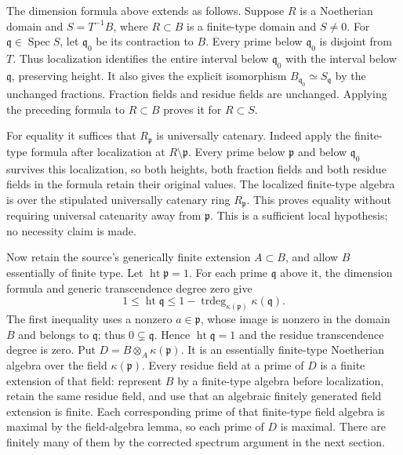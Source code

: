 The dimension formula above extends as follows. Suppose \(R\) is a Noetherian domain and \(S=T^{-1}B\), where \(R\subset B\) is a finite-type domain and \(S\ne0\). For \(\mathfrak q\in\operatorname{Spec}S\), let \(\mathfrak q_0\) be its contraction to \(B\). Every prime below \(\mathfrak q_0\) is disjoint from \(T\). Thus localization identifies the entire interval below \(\mathfrak q_0\) with the interval below \(\mathfrak q\), preserving height. It also gives the explicit isomorphism \(B_{\mathfrak q_0}\simeq S_{\mathfrak q}\) by the unchanged fractions. Fraction fields and residue fields are unchanged. Applying the preceding formula to \(R\subset B\) proves it for \(R\subset S\).

For equality it suffices that \(R_{\mathfrak p}\) is universally catenary. Indeed apply the finite-type formula after localization at \(R\setminus\mathfrak p\). Every prime below \(\mathfrak p\) and below \(\mathfrak q_0\) survives this localization, so both heights, both fraction fields and both residue fields in the formula retain their original values. The localized finite-type algebra is over the stipulated universally catenary ring \(R_{\mathfrak p}\). This proves equality without requiring universal catenarity away from \(\mathfrak p\). This is a sufficient local hypothesis; no necessity claim is made.

Now retain the source's generically finite extension \(A\subset B\), and allow \(B\) essentially of finite type. Let \(\operatorname{ht}\mathfrak p=1\). For each prime \(\mathfrak q\) above it, the dimension formula and generic transcendence degree zero give \[
 1\leq\operatorname{ht}\mathfrak q
 \leq1-\operatorname{trdeg}_{\kappa(\mathfrak p)}\kappa(\mathfrak q).
\] The first inequality uses a nonzero \(a\in\mathfrak p\), whose image is nonzero in the domain \(B\) and belongs to \(\mathfrak q\); thus \(0\subsetneq\mathfrak q\). Hence \(\operatorname{ht}\mathfrak q=1\) and the residue transcendence degree is zero. Put \(D=B\otimes_A\kappa(\mathfrak p)\). It is an essentially finite-type Noetherian algebra over the field \(\kappa(\mathfrak p)\). Every residue field at a prime of \(D\) is a finite extension of that field: represent \(B\) by a finite-type algebra before localization, retain the same residue field, and use that an algebraic finitely generated field extension is finite. Each corresponding prime of that finite-type field algebra is maximal by the field-algebra lemma, so each prime of \(D\) is maximal. There are finitely many of them by the corrected spectrum argument in the next section.


